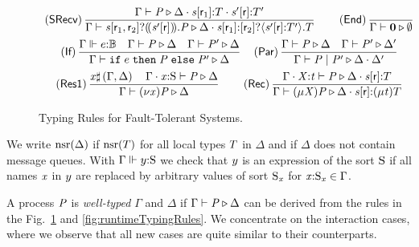 \begin{figure}[tp]
\[\begin{array}{c}
		\left( \textsf{SRecv} \right) \dfrac{\Gamma \vdash \PT \triangleright \Delta \compS \Typed{\AT{\Chan}{\Role_1}}{\LT} \compS \Typed{\AT{\Chan'}{\Role}}{\LT'}}{\Gamma \vdash \PDelB{\Chan}{\Role_1}{\Role_2}{\AT{\Chan'}{\Role}}{\PT} \triangleright \Delta \compS \Typed{\AT{\Chan}{\Role_1}}{\LDelB{\Role_2}{\Chan'}{\Role}{\LT'}{\LT}}} \hspace{2em}
		\left( \textsf{End} \right) \dfrac{}{\Gamma \vdash \PEnd \triangleright \emptyset} \vspace{0.5em}\\
		\left( \textsf{If} \right) \dfrac{\Gamma \Vdash \Typed{\Expr}{\bool} \quad \Gamma \vdash \PT \triangleright \Delta \quad \Gamma \vdash \PT' \triangleright \Delta}{\Gamma \vdash \PITE{\Expr}{\PT}{\PT'} \triangleright \Delta} \hspace{1em}
		\left( \textsf{Par} \right) \dfrac{\Gamma \vdash \PT \triangleright \Delta \quad \Gamma \vdash \PT' \triangleright \Delta'}{\Gamma \vdash \PT \mid \PT' \triangleright \Delta \compS \Delta'} \vspace{0.5em}\\
		\left( \textsf{Res1} \right) \dfrac{\Args \sharp \left( \Gamma, \Delta \right) \quad \Gamma \compS \Typed{\Args}{\Sort} \vdash \PT \triangleright \Delta}{\Gamma \vdash \PRes{\Args}{\PT} \triangleright \Delta} \hspace{2em}
		\left( \textsf{Rec} \right) \dfrac{\Gamma \compS \Typed{\ProcV}{\TypeV} \vdash \PT \triangleright \Delta \compS \Typed{\AT{\Chan[s]}{\Role}}{\LT}}{\Gamma \vdash \PRep{\ProcV}{\PT} \triangleright \Delta \compS \Typed{\AT{\Chan[s]}{\Role}}{\LRep{\TypeV}{\LT}}}
	\end{array} \]
	\caption{Typing Rules for Fault-Tolerant Systems.}
	\label{fig:typingRules}
\end{figure}

We write $ \Unreliable{\Delta} $ if $ \Unreliable{\LT} $ for all local types $ \LT $ in $ \Delta $ and if $ \Delta $ does not contain message queues.
With $ \Gamma \Vdash \Typed{\Expr[y]}{\Sort} $ we check that $ \Expr[y] $ is an expression of the sort $ \Sort $ if all names $ \Args $ in $ \Expr[y] $ are replaced by arbitrary values of sort $ \Sort_{\Args} $ for $ \Typed{\Args}{\Sort_{\Args}} \in \Gamma $.

A process $ \PT $ is \emph{well-typed} \wrt $ \Gamma $ and $ \Delta $ if $ \Gamma \vdash \PT \triangleright \Delta $ can be derived from the rules in the Fig.~\ref{fig:typingRules} and \ref{fig:runtimeTypingRules}.
We concentrate on the interaction cases, where we observe that all new cases are quite similar to their \strongR counterparts.

